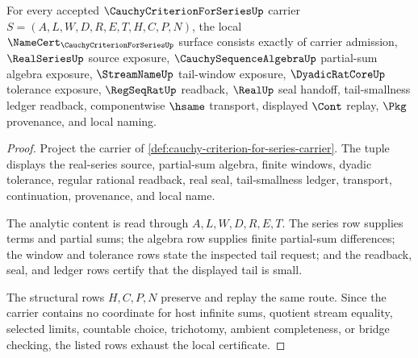 \begin{theorem}
\label{thm:cauchy-criterion-for-series-namecert-obligations}
For every accepted $\CauchyCriterionForSeriesUp$ carrier $S=(A,L,W,D,R,E,T,H,C,P,N)$, the local $\NameCert_{\CauchyCriterionForSeriesUp}$ surface consists exactly of carrier admission, $\RealSeriesUp$ source exposure, $\CauchySequenceAlgebraUp$ partial-sum algebra exposure, $\StreamNameUp$ tail-window exposure, $\DyadicRatCoreUp$ tolerance exposure, $\RegSeqRatUp$ readback, $\RealUp$ seal handoff, tail-smallness ledger readback, componentwise $\hsame$ transport, displayed $\Cont$ replay, $\Pkg$ provenance, and local naming.
\end{theorem}
\begin{proof}
Project the carrier of \autoref{def:cauchy-criterion-for-series-carrier}. The tuple displays the real-series source, partial-sum algebra, finite windows, dyadic tolerance, regular rational readback, real seal, tail-smallness ledger, transport, continuation, provenance, and local name.

The analytic content is read through $A,L,W,D,R,E,T$. The series row supplies terms and partial sums; the algebra row supplies finite partial-sum differences; the window and tolerance rows state the inspected tail request; and the readback, seal, and ledger rows certify that the displayed tail is small.

The structural rows $H,C,P,N$ preserve and replay the same route. Since the carrier contains no coordinate for host infinite sums, quotient stream equality, selected limits, countable choice, trichotomy, ambient completeness, or bridge checking, the listed rows exhaust the local certificate.
\end{proof}

